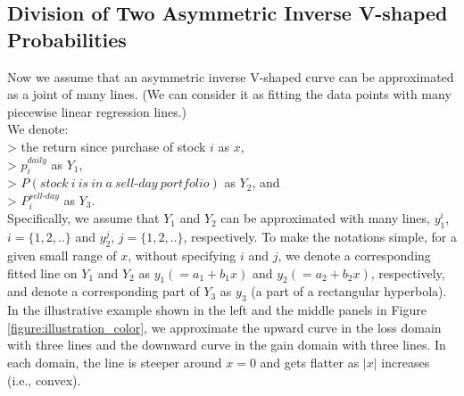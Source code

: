 \documentclass[11pt, a4paper]{article}
\begin{document}

\subsection{Division of Two Asymmetric Inverse V-shaped Probabilities}
\label{section:division_two_inverse_v}

Now we assume that an asymmetric inverse V-shaped curve can be approximated as a joint of many lines. (We can consider it as fitting the data points with many piecewise linear regression lines.)\\

\noindent
We denote:\\
> the return since purchase of stock $i$ as $x$, \\
> $p^{daily}_{i}$ as $Y_1$,\\
> $P(stock~i~is~in~a~sell\mbox{-}day~portfolio)$ as $Y_2$, and \\
> $P^{sell\mbox{-}day}_{i}$ as $Y_3$.\\

\noindent
Specifically, we assume that $Y_1$ and $Y_2$ can be approximated with many lines, $y^i_1$, $i=\{1,2,..\}$ and $y^j_2$, $j=\{1,2,..\}$, respectively.
To make the notations simple, for a given small range of $x$, without specifying $i$ and $j$, we denote a corresponding fitted line on $Y_1$ and $Y_2$ as $y_1(=a_1+b_1x)$ and $y_2(=a_2+b_2x)$, respectively, and denote a corresponding part of $Y_3$ as $y_3$ (a part of a rectangular hyperbola).\\


\noindent
In the illustrative example shown in the left and the middle panels in Figure \ref{figure:illustration_color}, we approximate the upward curve in the loss domain with three lines and the downward curve in the gain domain with three lines. In each domain, the line is steeper around $x=0$ and gets flatter as $|x|$ increases (i.e., convex).\\
\end{document}

